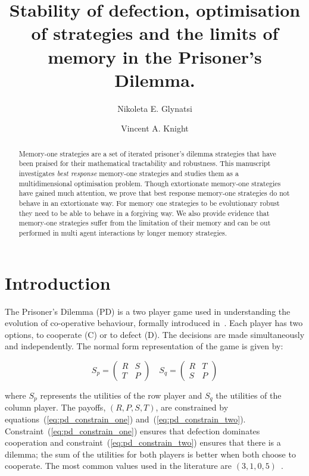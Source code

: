 \documentclass[10pt]{article}
\title{Stability of defection, optimisation of strategies and the limits of
       memory in the Prisoner's Dilemma.}
\author{Nikoleta E. Glynatsi \and Vincent A. Knight}
\date{}
\begin{document}
\maketitle

\begin{abstract}
    Memory-one strategies are a set of iterated prisoner’s dilemma strategies
    that have been praised for their mathematical tractability and robustness.
    This manuscript investigates \textit{best response} memory-one strategies
    and studies them as a multidimensional optimisation problem. Though extortionate
    memory-one strategies have gained much attention, we prove that best response
    memory-one strategies do not behave in an extortionate way. For memory
    one strategies to be evolutionary robust they need to be able to behave in a
    forgiving way. We also provide evidence that memory-one strategies suffer
    from the limitation of their memory and can be out performed in multi agent
    interactions by longer memory strategies.
\end{abstract}

\section{Introduction}\label{section:introduction}

The Prisoner's Dilemma (PD) is a two player game used in understanding the
evolution of co-operative behaviour, formally introduced in~\cite{Flood1958}.
Each player has two options, to cooperate (C) or to defect (D). The decisions
are made simultaneously and independently. The normal form representation of the
game is given by:

\begin{equation}\label{equ:pd_definition}
    S_p =
    \begin{pmatrix}
        R & S  \\
        T & P
    \end{pmatrix}
    \quad
    S_q =
    \begin{pmatrix}
        R & T  \\
        S & P
    \end{pmatrix}
\end{equation}

where \(S_p\) represents the utilities of the row player and \(S_q\) the
utilities of the column player. The payoffs, \((R, P, S, T)\), are constrained
by equations~(\ref{eq:pd_constrain_one}) and~(\ref{eq:pd_constrain_two}).
Constraint~(\ref{eq:pd_constrain_one}) ensures that
defection dominates cooperation and constraint~(\ref{eq:pd_constrain_two})
ensures that there is a dilemma; the sum of the utilities for both players is
better when both choose to cooperate. The most common values used in the literature are
\((3, 1, 0, 5)\)~\cite{Axelrod1981}.
\end{document}
